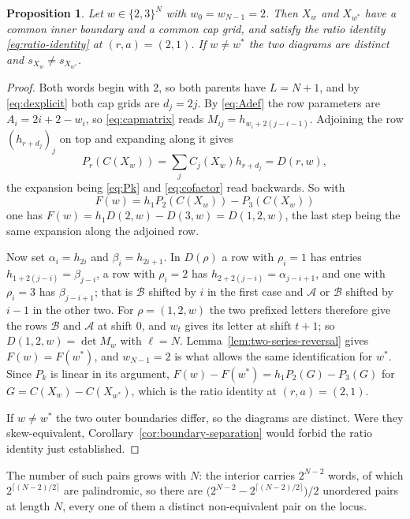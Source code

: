 \documentclass[11pt,a4paper]{amsart}
\numberwithin{equation}{section}
\theoremstyle{plain}
\newtheorem{proposition}[theorem]{Proposition}
\theoremstyle{definition}
\begin{document}
\begin{proposition}\label{prop:staircase-reversal}
Let \(w\in\{2,3\}^N\) with \(w_0=w_{N-1}=2\).  Then \(X_w\) and \(X_{w^{*}}\) have a
common inner boundary and a common cap grid, and satisfy the ratio identity
\eqref{eq:ratio-identity} at \((r,a)=(2,1)\).  If \(w\ne w^{*}\) the two diagrams
are distinct and \(s_{X_w}\ne s_{X_{w^{*}}}\).
\end{proposition}

\begin{proof}
Both words begin with \(2\), so both parents have \(L=N+1\), and by
\eqref{eq:dexplicit} both cap grids are \(d_j=2j\).  By \eqref{eq:Adef} the row
parameters are \(A_i=2i+2-w_i\), so \eqref{eq:capmatrix} reads
\(M_{ij}=h_{w_i+2(j-i-1)}\).  Adjoining the row \((h_{r+d_j})_j\) on top and
expanding along it gives
\[
P_r(C(X_w))=\sum_j C_j(X_w)h_{r+d_j}=D(r,w),
\]
the expansion being \eqref{eq:Pk} and \eqref{eq:cofactor} read backwards.  So with
\[
F(w)=h_1P_2(C(X_w))-P_3(C(X_w))
\]
one has \(F(w)=h_1D(2,w)-D(3,w)=D(1,2,w)\), the last step being the same
expansion along the adjoined row.

Now set \(\alpha_i=h_{2i}\) and
\(\beta_i=h_{2i+1}\).  In \(D(\rho)\) a row with \(\rho_i=1\) has entries
\(h_{1+2(j-i)}=\beta_{j-i}\), a row with \(\rho_i=2\) has
\(h_{2+2(j-i)}=\alpha_{j-i+1}\), and one with \(\rho_i=3\) has
\(\beta_{j-i+1}\); that is \(\mathcal B\) shifted by \(i\) in the first case and
\(\mathcal A\) or \(\mathcal B\) shifted by \(i-1\) in the other two.  For
\(\rho=(1,2,w)\) the two prefixed letters therefore give the rows \(\mathcal B\)
and \(\mathcal A\) at shift \(0\), and \(w_t\) gives its letter at shift \(t+1\);
so \(D(1,2,w)=\det M_w\) with \(\ell=N\).
Lemma~\ref{lem:two-series-reversal} gives \(F(w)=F(w^{*})\), and
\(w_{N-1}=2\) is what allows the same identification for \(w^{*}\).  Since
\(P_k\) is linear in its argument, \(F(w)-F(w^{*})=h_1P_2(G)-P_3(G)\) for
\(G=C(X_w)-C(X_{w^{*}})\), which is the ratio identity at \((r,a)=(2,1)\).

If \(w\ne w^{*}\) the two outer boundaries differ, so the diagrams are distinct.
Were they skew-equivalent, Corollary~\ref{cor:boundary-separation} would forbid
the ratio identity just established.
\end{proof}

The number of such pairs grows with \(N\): the interior carries \(2^{N-2}\) words,
of which \(2^{\lceil(N-2)/2\rceil}\) are palindromic, so there are
\(\bigl(2^{N-2}-2^{\lceil(N-2)/2\rceil}\bigr)/2\) unordered pairs at length \(N\),
every one of them a distinct non-equivalent pair on the locus.
\end{document}
